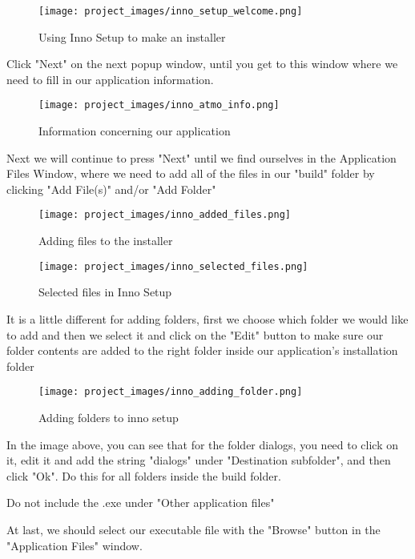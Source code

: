 \begin{figure}[H]
\centering
\texttt{[image: project\_images/inno\_setup\_welcome.png]}
 \caption{Using Inno Setup to make an installer}
 \label{fig:inno setup welcome}
\end{figure}

	Click "Next" on the next popup window, until you get to this window where we need to fill in our application information.

\begin{figure}[H]
\centering
\texttt{[image: project\_images/inno\_atmo\_info.png]}
 \caption{Information concerning our application}
 \label{fig:inno atmo info}
\end{figure}

	Next we will continue to press "Next" until we find ourselves in the Application Files Window, where we need to add all of the files in our "build" folder by clicking "Add File(s)" and/or "Add Folder"

\begin{figure}[H]
\centering
\texttt{[image: project\_images/inno\_added\_files.png]}
 \caption{Adding files to the installer}
 \label{fig:inno added files}
\end{figure}

\begin{figure}[H]
\centering
\texttt{[image: project\_images/inno\_selected\_files.png]}
 \caption{Selected files in Inno Setup}
 \label{fig:inno selected files}
\end{figure}
	
	It is a little different for adding folders, first we choose which folder we would like to add and then we select it and click on the "Edit" button to make sure our folder contents are added to the right folder inside our application's installation folder

\begin{figure}[H]
\centering
\texttt{[image: project\_images/inno\_adding\_folder.png]}
 \caption{Adding folders to inno setup}
 \label{fig:inno adding folder}
\end{figure}

	In the image above, you can see that for the folder dialogs, you need to click on it, edit it and add the string "dialogs" under "Destination subfolder", and then click "Ok". Do this for all folders inside the build folder.

	Do not include the .exe under "Other application files"

	At last, we should select our executable file with the "Browse" button in the "Application Files" window.


